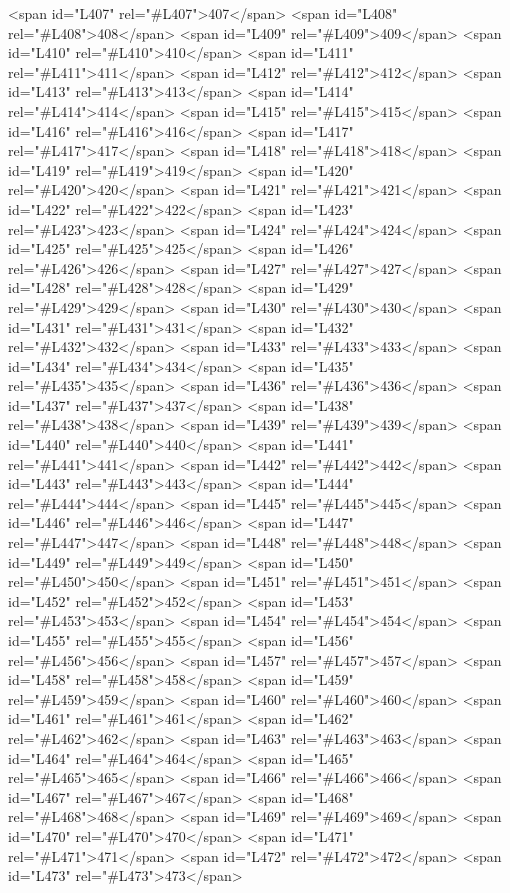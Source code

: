 <span id="L407" rel="#L407">407</span>
<span id="L408" rel="#L408">408</span>
<span id="L409" rel="#L409">409</span>
<span id="L410" rel="#L410">410</span>
<span id="L411" rel="#L411">411</span>
<span id="L412" rel="#L412">412</span>
<span id="L413" rel="#L413">413</span>
<span id="L414" rel="#L414">414</span>
<span id="L415" rel="#L415">415</span>
<span id="L416" rel="#L416">416</span>
<span id="L417" rel="#L417">417</span>
<span id="L418" rel="#L418">418</span>
<span id="L419" rel="#L419">419</span>
<span id="L420" rel="#L420">420</span>
<span id="L421" rel="#L421">421</span>
<span id="L422" rel="#L422">422</span>
<span id="L423" rel="#L423">423</span>
<span id="L424" rel="#L424">424</span>
<span id="L425" rel="#L425">425</span>
<span id="L426" rel="#L426">426</span>
<span id="L427" rel="#L427">427</span>
<span id="L428" rel="#L428">428</span>
<span id="L429" rel="#L429">429</span>
<span id="L430" rel="#L430">430</span>
<span id="L431" rel="#L431">431</span>
<span id="L432" rel="#L432">432</span>
<span id="L433" rel="#L433">433</span>
<span id="L434" rel="#L434">434</span>
<span id="L435" rel="#L435">435</span>
<span id="L436" rel="#L436">436</span>
<span id="L437" rel="#L437">437</span>
<span id="L438" rel="#L438">438</span>
<span id="L439" rel="#L439">439</span>
<span id="L440" rel="#L440">440</span>
<span id="L441" rel="#L441">441</span>
<span id="L442" rel="#L442">442</span>
<span id="L443" rel="#L443">443</span>
<span id="L444" rel="#L444">444</span>
<span id="L445" rel="#L445">445</span>
<span id="L446" rel="#L446">446</span>
<span id="L447" rel="#L447">447</span>
<span id="L448" rel="#L448">448</span>
<span id="L449" rel="#L449">449</span>
<span id="L450" rel="#L450">450</span>
<span id="L451" rel="#L451">451</span>
<span id="L452" rel="#L452">452</span>
<span id="L453" rel="#L453">453</span>
<span id="L454" rel="#L454">454</span>
<span id="L455" rel="#L455">455</span>
<span id="L456" rel="#L456">456</span>
<span id="L457" rel="#L457">457</span>
<span id="L458" rel="#L458">458</span>
<span id="L459" rel="#L459">459</span>
<span id="L460" rel="#L460">460</span>
<span id="L461" rel="#L461">461</span>
<span id="L462" rel="#L462">462</span>
<span id="L463" rel="#L463">463</span>
<span id="L464" rel="#L464">464</span>
<span id="L465" rel="#L465">465</span>
<span id="L466" rel="#L466">466</span>
<span id="L467" rel="#L467">467</span>
<span id="L468" rel="#L468">468</span>
<span id="L469" rel="#L469">469</span>
<span id="L470" rel="#L470">470</span>
<span id="L471" rel="#L471">471</span>
<span id="L472" rel="#L472">472</span>
<span id="L473" rel="#L473">473</span>
